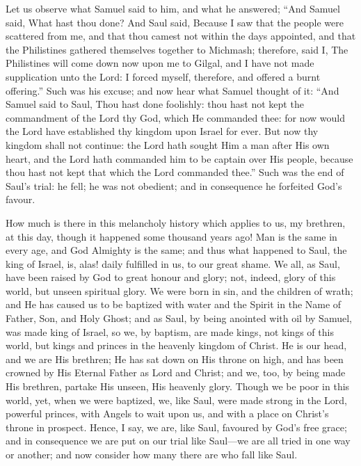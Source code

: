 Let us observe what Samuel said to him, and what he answered;
``And Samuel said, What hast thou done? And Saul said, Because I
saw that the people were scattered from me, and that thou camest not
within the days appointed, and that the Philistines gathered
themselves together to Michmash; therefore, said I, The Philistines
will come down now upon me to Gilgal, and I have not made supplication
unto the Lord: I forced myself, therefore, and offered a burnt
offering.'' Such was his excuse; and now hear what Samuel thought
of it: ``And Samuel said to Saul, Thou hast done foolishly: thou
hast not kept the commandment of the Lord thy God, which He commanded
thee: for now would the Lord have established thy kingdom upon Israel
for ever. But now thy kingdom shall not continue: the Lord hath sought
Him a man after His own heart, and the Lord hath commanded him to be
captain over His people, because thou hast not kept that which the
Lord commanded thee.'' Such was the end of Saul's trial: he fell;
he was not obedient; and in consequence he forfeited God's favour.

How much is there in this melancholy history which applies to us,
my brethren, at this day, though it happened some thousand years ago!
Man is the same in every age, and God Almighty is the same; and thus
what happened to Saul, the king of Israel, is, alas! daily fulfilled
in us, to our great shame. We all, as Saul, have been raised by God to
great honour and glory; not, indeed, glory of this world, but unseen
spiritual glory. We were born in sin, and the children of wrath; and
He has caused us to be baptized with water and the Spirit in the Name
of Father, Son, and Holy Ghost; and as Saul, by being anointed with
oil by Samuel, was made king of Israel, so we, by baptism, are made
kings, not kings of this world, but kings and princes in the heavenly
kingdom of Christ. He is our head, and we are His brethren; He has sat
down on His throne on high, and has been crowned by His Eternal Father
as Lord and Christ; and we, too, by being made His brethren, partake
His unseen, His heavenly glory. Though we be poor in this world, yet,
when we were baptized, we, like Saul, were made strong in the Lord,
powerful princes, with Angels to wait upon us, and with a place on
Christ's throne in prospect. Hence, I say, we are, like Saul, favoured
by God's free grace; and in consequence we are put on our trial like
Saul—we are all tried in one way or another; and now consider how
many there are who fall like Saul.

